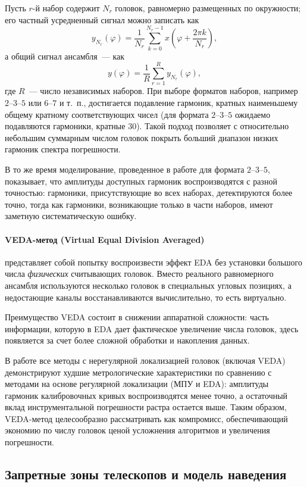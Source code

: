 Пусть $r$-й набор содержит $N_r$ головок, равномерно размещенных по окружности; его частный усредненный сигнал можно записать как
$$
y_{N_r}(\varphi)
=
\frac{1}{N_r}
\sum_{k=0}^{N_r-1}
x\left(\varphi + \frac{2\pi k}{N_r}\right),
$$
а общий сигнал ансамбля~--- как
$$
y(\varphi)
=
\frac{1}{R}
\sum_{r=1}^{R} y_{N_r}(\varphi),
$$
где $R$~--- число независимых наборов.
При выборе форматов наборов, например $2$–$3$–$5$ или $6$–$7$ и т.~п., достигается подавление гармоник, кратных наименьшему общему кратному соответствующих чисел (для формата $2$–$3$–$5$ ожидаемо подавляются гармоники, кратные $30$).
Такой подход позволяет с относительно небольшим суммарным числом головок покрыть больший диапазон низких гармоник спектра погрешности.

В то же время моделирование, проведенное в работе \cite{kiryanov-overview} для формата $2$–$3$–$5$, показывает, что амплитуды доступных гармоник воспроизводятся с разной точностью: гармоники, присутствующие во всех наборах, детектируются более точно, тогда как гармоники, возникающие только в части наборов, имеют заметную систематическую ошибку.

\paragraph{VEDA-метод (Virtual Equal Division Averaged)} \cite{ishii-veda}
представляет собой попытку воспроизвести эффект EDA без установки большого числа \textit{физических} считывающих головок.
Вместо реального равномерного ансамбля используются несколько головок в специальных угловых позициях, а недостающие каналы восстанавливаются вычислительно, то есть виртуально.

Преимущество VEDA состоит в снижении аппаратной сложности: часть информации, которую в EDA дает фактическое увеличение числа головок, здесь появляется за счет более сложной обработки и накопления данных.

В работе \cite{kiryanov-overview} все методы с нерегулярной локализацией головок (включая VEDA) демонстрируют худшие метрологические характеристики по сравнению с методами на основе регулярной локализации (МПУ и EDA): амплитуды гармоник калибровочных кривых воспроизводятся менее точно, а остаточный вклад инструментальной погрешности растра остается выше.
Таким образом, VEDA-метод целесообразно рассматривать как компромисс, обеспечивающий экономию по числу головок ценой усложнения алгоритмов и увеличения погрешности.

\subsection{Запретные зоны телескопов и модель наведения}
\label{sec:forbidden}

